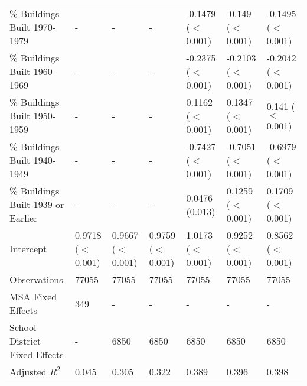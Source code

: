 \begin{landscape}
\begin{table}[h]
\begin{tabular}{l|llllll}
\% Buildings Built 1970-1979 &- & - & - & -0.1479 ($<$0.001) & -0.149 ($<$0.001) & -0.1495 ($<$0.001) \\
\% Buildings Built 1960-1969 &- & - & - & -0.2375 ($<$0.001) & -0.2103 ($<$0.001) & -0.2042 ($<$0.001) \\
\% Buildings Built 1950-1959 &- & - & - & 0.1162 ($<$0.001) & 0.1347 ($<$0.001) & 0.141 ($<$0.001) \\
\% Buildings Built 1940-1949 &- & - & - & -0.7427 ($<$0.001) & -0.7051 ($<$0.001) & -0.6979 ($<$0.001) \\
\% Buildings Built 1939 or Earlier &- & - & - & 0.0476 (0.013) & 0.1259 ($<$0.001) & 0.1709 ($<$0.001) \\
Intercept &0.9718 ($<$0.001) & 0.9667 ($<$0.001) & 0.9759 ($<$0.001) & 1.0173 ($<$0.001) & 0.9252 ($<$0.001) & 0.8562 ($<$0.001) \\
Observations &77055 & 77055 & 77055 & 77055 & 77055 & 77055 \\
MSA Fixed Effects &349 & - & - & - & - & - \\
School District Fixed Effects &- & 6850 & 6850 & 6850 & 6850 & 6850 \\
Adjusted $R^2$ &0.045 & 0.305 & 0.322 & 0.389 & 0.396 & 0.398 \\\hline
\end{tabular}
\end{table}
\newpage
\end{landscape}
\restoregeometry
